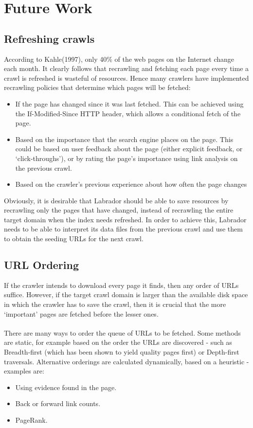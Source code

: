 \chapter{Future Work}\label{chp-future}
\section{Refreshing crawls}
According to Kahle(1997), only 40\%\cite{kahle97archiving} of the web pages on the Internet change each month. It clearly follows that recrawling and fetching each page every time a crawl is refreshed is wasteful of resources. Hence many crawlers have implemented recrawling policies that determine which pages will be fetched:
\begin{itemize}
\item{If the page has changed since it was last fetched. This can be achieved using the If-Modified-Since HTTP header, which allows a conditional fetch of the page.}
\item{Based on the importance that the search engine places on the page. This could be based on user feedback about the page (either explicit feedback, or `click-throughs'), or by rating the page's importance using link analysis on the previous crawl.}
\item{Based on the crawler's previous experience about how often the page changes}
\end{itemize}
Obviously, it is desirable that Labrador should be able to save resources by recrawling only the pages that have changed, instead of recrawling the entire target domain when the index needs refreshed. In order to achieve this, Labrador needs to be able to interpret its data files from the previous crawl and use them to obtain the seeding URLs for the next crawl.

\section{URL Ordering}
If the crawler intends to download every page it finds, then any order of URLs suffice. However, if the target crawl domain is larger than the available disk space in which the crawler has to save the crawl\cite{kahle97archiving}, then it is crucial that the more `important' pages are fetched before the lesser ones\cite{ref5}.\\
\ \\
There are many ways to order the queue of URLs to be fetched. Some methods are static, for example based on the order the URLs are discovered - such as Breadth-first (which has been shown to yield quality pages first\cite{ref8}) or Depth-first traversals\footnotemark. Alternative orderings are calculated dynamically, based on a heuristic - examples are:
\begin{itemize}
\item{Using evidence found in the page.}
\item{Back or forward link counts.}
\item{PageRank.}
\end{itemize}

